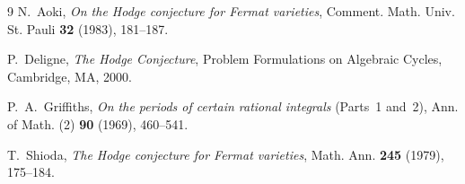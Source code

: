 \documentclass[11pt,a4paper]{article}
\begin{document}
\begin{thebibliography}{9}
N.~Aoki, \emph{On the Hodge conjecture for Fermat varieties}, Comment. Math. Univ. St. Pauli \textbf{32} (1983), 181--187.

P.~Deligne, \emph{The Hodge Conjecture}, Problem Formulations on Algebraic Cycles, Cambridge, MA, 2000.

P.~A.~Griffiths, \emph{On the periods of certain rational integrals} (Parts~1 and~2), Ann. of Math. (2) \textbf{90} (1969), 460--541.

T.~Shioda, \emph{The Hodge conjecture for Fermat varieties}, Math. Ann. \textbf{245} (1979), 175--184.
\end{thebibliography}
\end{document}
